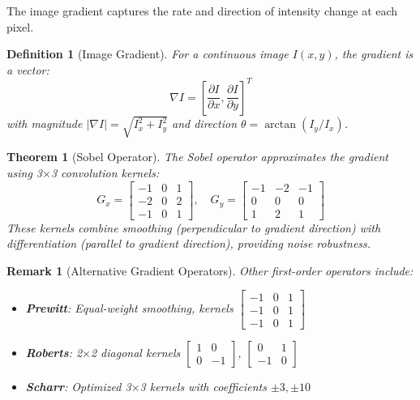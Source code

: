 \documentclass[a4paper, 11pt]{article}
\newtheorem{definition}{Definition}[section]
\newtheorem{theorem}{Theorem}[section]
\newtheorem{remark}{Remark}[section]
\begin{document}
The image gradient captures the rate and direction of intensity change at each pixel.

\begin{definition}[Image Gradient]
For a continuous image $I(x,y)$, the gradient is a vector:
\begin{equation}
\nabla I = \left[\frac{\partial I}{\partial x}, \frac{\partial I}{\partial y}\right]^T
\end{equation}
with magnitude $|\nabla I| = \sqrt{I_x^2 + I_y^2}$ and direction $\theta = \arctan(I_y/I_x)$.
\end{definition}

\begin{theorem}[Sobel Operator]
The Sobel operator approximates the gradient using 3$\times$3 convolution kernels:
\begin{equation}
G_x = \begin{bmatrix} -1 & 0 & 1 \\ -2 & 0 & 2 \\ -1 & 0 & 1 \end{bmatrix}, \quad
G_y = \begin{bmatrix} -1 & -2 & -1 \\ 0 & 0 & 0 \\ 1 & 2 & 1 \end{bmatrix}
\end{equation}
These kernels combine smoothing (perpendicular to gradient direction) with differentiation
(parallel to gradient direction), providing noise robustness.
\end{theorem}

\begin{remark}[Alternative Gradient Operators]
Other first-order operators include:
\begin{itemize}
\item \textbf{Prewitt}: Equal-weight smoothing, kernels $\begin{bmatrix} -1 & 0 & 1 \\ -1 & 0 & 1 \\ -1 & 0 & 1 \end{bmatrix}$
\item \textbf{Roberts}: 2$\times$2 diagonal kernels $\begin{bmatrix} 1 & 0 \\ 0 & -1 \end{bmatrix}$, $\begin{bmatrix} 0 & 1 \\ -1 & 0 \end{bmatrix}$
\item \textbf{Scharr}: Optimized 3$\times$3 kernels with coefficients $\pm 3, \pm 10$
\end{itemize}
\end{remark}
\end{document}
